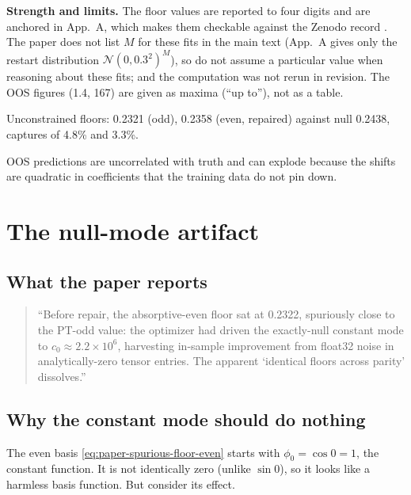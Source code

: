 \textbf{Strength and limits.} The floor values are reported to four digits and are anchored in App.~A, which makes them checkable against the Zenodo record \cite{zenodo}. The paper does not list $M$ for these fits in the main text (App.~A gives only the restart distribution $\mathcal N(0,0.3^2)^M$), so do not assume a particular value when reasoning about these fits; and the computation was not rerun in revision. The OOS figures (1.4, 167) are given as maxima (``up to''), not as a table.

\begin{keyideas}
\item Unconstrained floors: 0.2321 (odd), 0.2358 (even, repaired) against null 0.2438, captures of 4.8\% and 3.3\%.
\item OOS predictions are uncorrelated with truth and can explode because the shifts are quadratic in coefficients that the training data do not pin down.
\end{keyideas}

\section{The null-mode artifact}\label{sec:paper-spurious-floor-nullmode}

\subsection{What the paper reports}

\begin{quote}
``Before repair, the absorptive-even floor sat at 0.2322, spuriously close to the PT-odd value: the optimizer had driven the exactly-null constant mode to $c_0\approx2.2\times10^6$, harvesting in-sample improvement from float32 noise in analytically-zero tensor entries. The apparent `identical floors across parity' dissolves.''
\end{quote}

\subsection{Why the constant mode should do nothing}

The even basis \cref{eq:paper-spurious-floor-even} starts with $\phi_0=\cos0=1$, the constant function. It is not identically zero (unlike $\sin0$), so it looks like a harmless basis function. But consider its effect.

